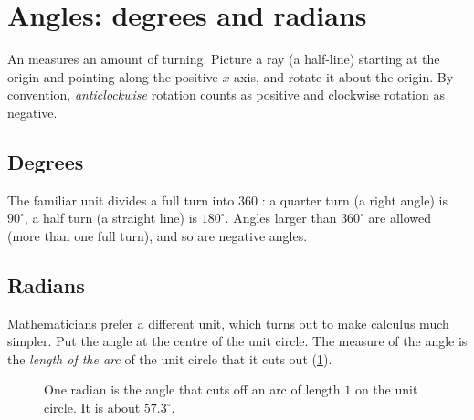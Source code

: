 \section{Angles: degrees and radians}\label{sec:angles}

An  measures an amount of turning. Picture a ray (a half-line)
starting at the origin and pointing along the positive $x$-axis, and rotate it
about the origin. By convention, \emph{anticlockwise} rotation counts as
positive and clockwise rotation as negative.

\subsection{Degrees}

The familiar unit divides a full turn into $360$ :
a quarter turn (a right angle) is $90^\circ$, a half turn (a straight line) is
$180^\circ$. Angles larger than $360^\circ$ are allowed (more than one full
turn), and so are negative angles.

\subsection{Radians}

Mathematicians prefer a different unit, which turns out to make calculus much
simpler. Put the angle at the centre of the unit circle. The
 measure of the angle is the \emph{length of the arc} of
the unit circle that it cuts out (\cref{fig:radian}).

\begin{figure}[htbp]
\centering
{}
\caption{One radian is the angle that cuts off an arc of length $1$ on the
  unit circle. It is about $57.3^\circ$.}
\label{fig:radian}
\end{figure}

